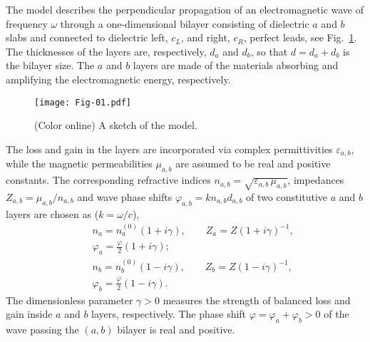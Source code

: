 \documentclass[aps,pra,reprint,showpacs,bibnotes,preprintnumbers,twoside,eqsecnum]{revtex4-1}
\begin{document}
The model describes the perpendicular propagation of an electromagnetic wave of frequency $\omega$ through a one-dimensional bilayer consisting of dielectric $a$ and $b$ slabs and connected to dielectric left, $c_L$, and right, $c_R$, perfect leads, see Fig.~\ref{fig:Fig-01}. The thicknesses of the layers are, respectively, $d_a$ and $d_b$, so that $d=d_a+d_b$ is the bilayer size. The $a$ and $b$ layers are made of the materials absorbing and amplifying the electromagnetic energy, respectively.
%
\begin{figure}[h!!!]
\centering
\texttt{[image: Fig-01.pdf]}
\caption{(Color online) A sketch of the model.}\label{fig:Fig-01}
\end{figure}
%
The loss and gain in the layers are incorporated via complex permittivities $\varepsilon_{a,b}$, while the magnetic permeabilities $\mu_{a,b}$ are assumed to be real and positive constants. The corresponding refractive indices $n_{a,b}=\sqrt{\varepsilon_{a,b}\,\mu_{a,b}}$, impedances $Z_{a,b}=\mu_{a,b}/n_{a,b}$ and wave phase shifts $\varphi_{a,b}=kn_{a,b}d_{a,b}$ of two constitutive $a$ and $b$ layers are chosen as ($k=\omega/c$),
%
\begin{subequations}\label{eq:BLMMDLG-nZphy}
\begin{eqnarray}
&&n_a=n_a^{(0)}(1+i\gamma),\qquad Z_a=Z(1+i\gamma)^{-1},\nonumber\\
&&\varphi_a=\frac{\varphi}{2}(1+i\gamma);\\
&&n_b=n_b^{(0)}(1-i\gamma),\qquad Z_b=Z(1-i\gamma)^{-1},\nonumber\\
&&\varphi_b=\frac{\varphi}{2}(1-i\gamma).
\end{eqnarray}
\end{subequations}
The dimensionless parameter $\gamma>0$ measures the stre\-ngth of balanced loss and gain inside $a$ and $b$ layers, respectively. The phase shift $\varphi=\varphi_a+\varphi_b>0$ of the wave passing the $(a,b)$ bilayer is real and positive.
\end{document}
